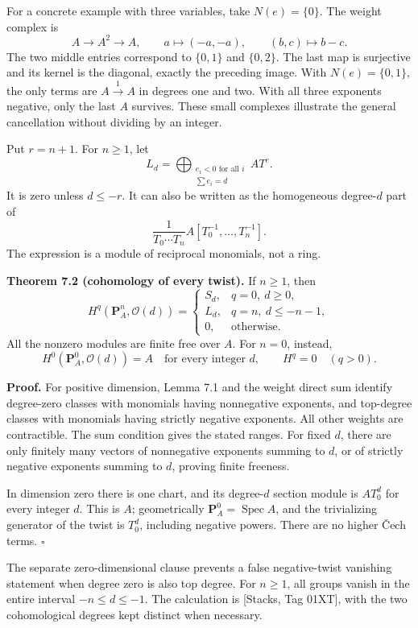 \documentclass[11pt,a4paper,openany]{report}
\begin{document}
For a concrete example with three variables, take \(N(e)=\{0\}\). The weight complex is \[
A\longrightarrow A^2\longrightarrow A,
\qquad a\longmapsto(-a,-a),\qquad(b,c)\longmapsto b-c.
\] The two middle entries correspond to \(\{0,1\}\) and \(\{0,2\}\). The last map is surjective and its kernel is the diagonal, exactly the preceding image. With \(N(e)=\{0,1\}\), the only terms are \(A\xrightarrow{1}A\) in degrees one and two. With all three exponents negative, only the last \(A\) survives. These small complexes illustrate the general cancellation without dividing by an integer.

Put \(r=n+1\). For \(n\ge1\), let \[
L_d=\bigoplus_{\substack{e_i<0\text{ for all }i\\\sum e_i=d}} A T^e.
\] It is zero unless \(d\le-r\). It can also be written as the homogeneous degree-\(d\) part of \[
\frac1{T_0\cdots T_n}A[T_0^{-1},\ldots,T_n^{-1}].
\] The expression is a module of reciprocal monomials, not a ring.

\textbf{Theorem 7.2 (cohomology of every twist).} If \(n\ge1\), then \[
H^q(\mathbf P_A^n,\mathcal O(d))=
\begin{cases}
S_d,&q=0,\ d\ge0,\\
L_d,&q=n,\ d\le-n-1,\\
0,&\text{otherwise}.
\end{cases}
\] All the nonzero modules are finite free over \(A\). For \(n=0\), instead, \[
H^0(\mathbf P_A^0,\mathcal O(d))=A\quad\text{for every integer }d,
\qquad H^q=0\quad(q>0).
\]

\textbf{Proof.} For positive dimension, Lemma 7.1 and the weight direct sum identify degree-zero classes with monomials having nonnegative exponents, and top-degree classes with monomials having strictly negative exponents. All other weights are contractible. The sum condition gives the stated ranges. For fixed \(d\), there are only finitely many vectors of nonnegative exponents summing to \(d\), or of strictly negative exponents summing to \(d\), proving finite freeness.

In dimension zero there is one chart, and its degree-\(d\) section module is \(A T_0^d\) for every integer \(d\). This is \(A\); geometrically \(\mathbf P_A^0=\operatorname{Spec}A\), and the trivializing generator of the twist is \(T_0^d\), including negative powers. There are no higher Čech terms. \(\square\)

The separate zero-dimensional clause prevents a false negative-twist vanishing statement when degree zero is also top degree. For \(n\ge1\), all groups vanish in the entire interval \(-n\le d\le-1\). The calculation is {[}Stacks, Tag 01XT{]}, with the two cohomological degrees kept distinct when necessary.
\end{document}
